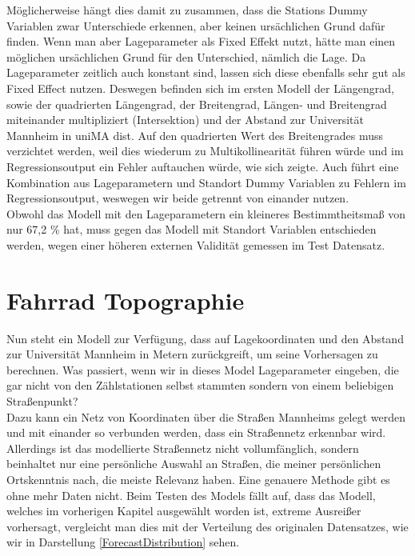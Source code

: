 \documentclass[a4paper,12pt]{thesis}
\begin{document}
Möglicherweise hängt dies damit zu zusammen, dass die Stations Dummy Variablen zwar Unterschiede erkennen, aber keinen ursächlichen Grund dafür finden. Wenn man aber Lageparameter als Fixed Effekt nutzt, hätte man einen möglichen ursächlichen Grund für den Unterschied, nämlich die Lage. Da Lageparameter zeitlich auch konstant sind, lassen sich diese ebenfalls sehr gut als Fixed Effect nutzen. Deswegen befinden sich im ersten Modell der Längengrad, sowie der quadrierten Längengrad, der Breitengrad, Längen- und Breitengrad miteinander multipliziert (Intersektion) und der Abstand zur Universität Mannheim in \glqq uniMA dist\grqq. Auf den quadrierten Wert des Breitengrades muss verzichtet werden, weil dies wiederum zu Multikollinearität führen würde und im Regressionsoutput ein Fehler auftauchen würde, wie sich zeigte. Auch führt eine Kombination aus Lageparametern und Standort Dummy Variablen zu Fehlern im Regressionsoutput, weswegen wir beide getrennt von einander nutzen.\\
Obwohl das Modell mit den Lageparametern ein kleineres Bestimmtheitsmaß von nur 67,2 \% hat, muss gegen das Modell mit Standort Variablen entschieden werden, wegen einer höheren externen Validität gemessen im Test Datensatz.

\section{Fahrrad Topographie}

Nun steht ein Modell zur Verfügung, dass auf Lagekoordinaten und den Abstand zur Universität Mannheim in Metern zurückgreift, um seine Vorhersagen zu berechnen. Was passiert, wenn wir in dieses Model Lageparameter eingeben, die gar nicht von den Zählstationen selbst stammten sondern von einem beliebigen Straßenpunkt?\\
Dazu kann ein Netz von Koordinaten über die Straßen Mannheims gelegt werden und mit einander so verbunden werden, dass ein Straßennetz erkennbar wird. Allerdings ist das modellierte Straßennetz nicht vollumfänglich, sondern beinhaltet nur eine persönliche Auswahl an Straßen, die meiner persönlichen Ortskenntnis nach, die meiste Relevanz haben. Eine genauere Methode gibt es ohne mehr Daten nicht. Beim Testen des Models fällt auf, dass das Modell, welches im vorherigen Kapitel ausgewählt worden ist, extreme Ausreißer vorhersagt, vergleicht man dies mit der Verteilung des originalen Datensatzes, wie wir in Darstellung \ref{ForecastDistribution} sehen. 
\end{document}
